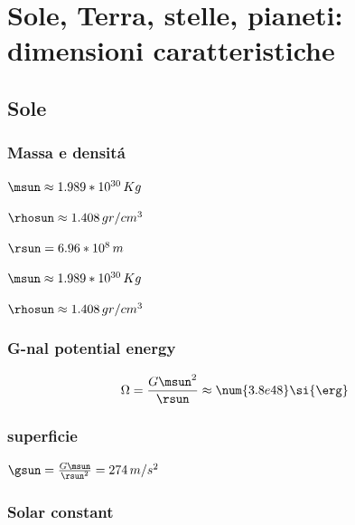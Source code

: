 \chapter{Sole, Terra, stelle, pianeti: dimensioni caratteristiche}
\PartialToc

\section{Sole}

\subsection{Massa e densit\'a}
\begin{itemize*}
\item $\msun\approx1.989*10^{30}\,Kg$
\item $\rhosun\approx1.408 \, gr/cm^3$
\end{itemize*}

\begin{itemize*}
\item $\rsun=6.96*10^8\,m$
\end{itemize*}
\begin{itemize*}
\item $\msun\approx1.989*10^{30}\,Kg$
\item $\rhosun\approx1.408 \, gr/cm^3$
\end{itemize*}

\subsection{G-nal potential energy}

\begin{equation*}
\Omega=\frac{G\msun^2}{\rsun}\approx\num{3.8e48}\si{\erg}
\end{equation*}

\subsection{superficie}

\begin{itemize*}
\item $\gsun=\frac{G\msun}{\rsun^2}=274\,m/s^2$
\end{itemize*} 

\subsection{Solar constant}

